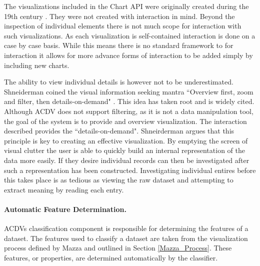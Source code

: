\documentclass[a4paper, 11pt, titlepage, onehalfspacing]{report}
\begin{document}
The visualizations included in the Chart API were originally created during the 19th century \cite{friendly2001milestones}. They were not created with interaction in mind. Beyond the inspection of individual elements there is not much scope for interaction with such visualizations. As each visualization is self-contained interaction is done on a case by case basis. While this means there is no standard framework to for interaction it allows for more advance forms of interaction to be added simply by including new charts.

The ability to view individual details is however not to be underestimated. Shneiderman coined the visual information seeking mantra ``Overview first, zoom and filter, then details-on-demand" \cite{shneiderman1996eyes}. This idea has taken root and is widely cited. Although AC\lightning{}DV does not support filtering, as it is not a data manipulation tool, the goal of the system is to provide and overview visualization. The interaction described provides the ``details-on-demand". Shneirderman argues that this principle is key to creating an effective visualization. By emptying the screen of visual clutter the user is able to quickly build an internal representation of the data more easily. If they desire individual records can then be investigated after such a representation has been constructed. Investigating individual entires before this takes place is as tedious as viewing the raw dataset and attempting to extract meaning by reading each entry.

\paragraph{Automatic Feature Determination.}
AC\lightning{}DVs classification component is responsible for determining the features of a dataset. The features used to classify a dataset are taken from the visualization process defined by Mazza and outlined in Section \ref{Mazza_Process}. These features, or properties, are determined automatically by the classifier.
\end{document}
